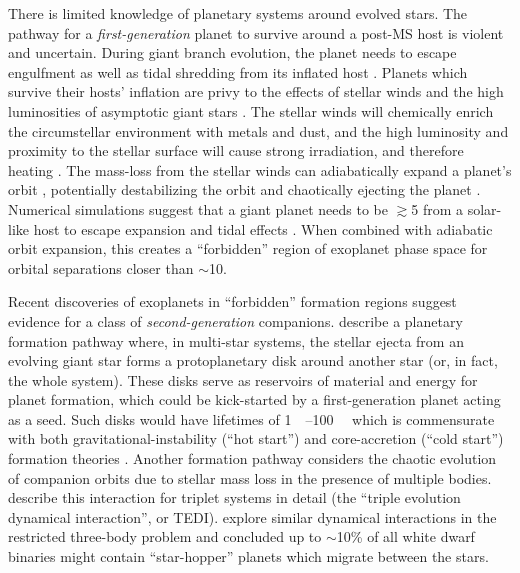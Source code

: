 \documentclass[twocolumn]{aastex631}
\begin{document}
There is limited knowledge of planetary systems around evolved stars. The pathway for a \textit{first-generation} planet to survive around a post-MS host is violent and uncertain. During giant branch evolution, the planet needs to escape engulfment as well as tidal shredding from its inflated host \citep{burleighImagingPlanetsNearby2002a,nordhausOrbitsLowmassCompanions2013}. Planets which survive their hosts' inflation are privy to the effects of stellar winds and the high luminosities of asymptotic giant stars \citep{mustillForetellingsRagnarokWorldengulfing2012,mustillMainsequenceProgenitorConfigurations2013,verasPostmainsequencePlanetarySystem2016}. The stellar winds will chemically enrich the circumstellar environment with metals and dust, and the high luminosity and proximity to the stellar surface will cause strong irradiation, and therefore heating \citep{spiegelJupiterWillBecome2012}. The mass-loss from the stellar winds can adiabatically expand a planet's orbit \citep{jeansCosmogonicProblemsAssociated1924}, potentially destabilizing the orbit and chaotically ejecting the planet \citep{kratterStarHoppersPlanet2012}. Numerical simulations suggest that a giant planet needs to be $\gtrsim$\qty{5}{\au} from a solar-like host to escape expansion and tidal effects \citep{spiegelJupiterWillBecome2012,nordhausOrbitsLowmassCompanions2013}. When combined with adiabatic orbit expansion, this creates a ``forbidden'' region of exoplanet phase space for orbital separations closer than $\sim$\qty{10}{\au}.

Recent discoveries of exoplanets in ``forbidden'' formation regions \citep{vanderburgGiantPlanetCandidate2020,blackmanJovianAnalogueOrbiting2021} suggest evidence for a class of \textit{second-generation} companions. \citet{peretsSecondGenerationPlanets2010,peretsPlanetsEvolvedBinary2011} describe a planetary formation pathway where, in multi-star systems, the stellar ejecta from an evolving giant star forms a protoplanetary disk around another star (or, in fact, the whole system). These disks serve as reservoirs of material and energy for planet formation, which could be kick-started by a first-generation planet acting as a seed. Such disks would have lifetimes of \qtyrange{1}{100}{\mega\year} which is commensurate with both gravitational-instability (``hot start'') and core-accretion (``cold start'') formation theories \citep{marleyLuminosityYoungJupiters2007,spiegelSpectralPhotometricDiagnostics2012a}. Another formation pathway considers the chaotic evolution of companion orbits due to stellar mass loss in the presence of multiple bodies. \citet{peretsTripleEvolutionDynamical2012} describe this interaction for triplet systems in detail (the ``triple evolution dynamical interaction'', or TEDI). \citet{kratterStarHoppersPlanet2012} explore similar dynamical interactions in the restricted three-body problem and concluded up to $\sim$10\% of all white dwarf binaries might contain ``star-hopper'' planets which migrate between the stars.
\end{document}

